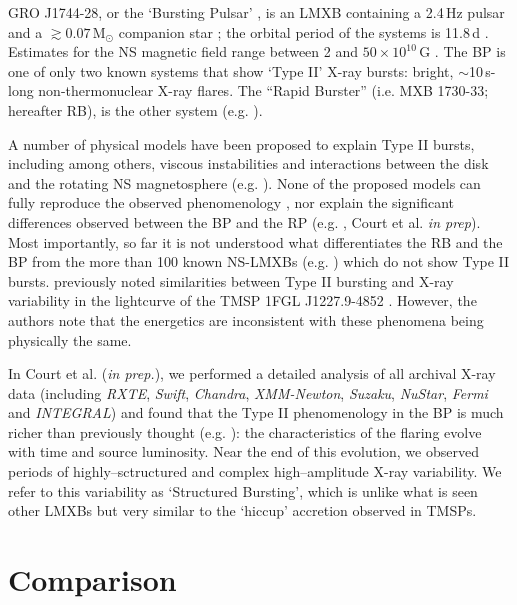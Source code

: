 \par GRO J1744-28, or the `Bursting Pulsar' \citep[hereafter BP,][]{Paciesas_BPDiscovery}, is an LMXB containing a 2.4\,Hz pulsar and a $\gtrsim0.07$\,M$_\odot$ companion star \citep[e.g.][]{Sturner_BPNature,Finger_BP,Degenaar_BPSpec}; the orbital period of the systems is 11.8\,d \citep{Finger_Pulse,Sanna_BP}. Estimates for the NS magnetic field range between  2 and $50\times10^{10}$\,G \citep{Finger_BP,Degenaar_BPSpec,Dai_OB3,Doroshenko_NBFlash}.  The BP is one of only two known systems that show `Type II' X-ray bursts: bright, $\sim$10\,s-long non-thermonuclear X-ray flares.  The ``Rapid Burster'' (i.e. MXB 1730-33; hereafter RB), is the other system (e.g. \citealp{Lewin_TypeII,Kouveliotou_BP}).
\par A number of physical models have been proposed to explain Type II bursts, including among others,  viscous instabilities and interactions between the disk and the rotating NS magnetosphere (e.g. \citealp{Taam_Evo,Spruit_Type2Mod}). None of the proposed models can fully reproduce the observed phenomenology \citep{Lewin_Bursts}, nor explain the significant differences observed between the BP and the RP  (e.g. \citealp{Lewin_BP}, Court et al. \textit{in prep}). Most importantly, so far it is not understood what differentiates the RB and the BP from the more than 100 known NS-LMXBs (e.g. \citealp{Liu_Catalog}) which do not show Type II bursts. \citealp{DeMartino_XSS} previously noted similarities between Type II bursting and X-ray variability in the lightcurve of the TMSP 1FGL J1227.9-4852 \citep{Hill_XSS}.  However, the authors note that the energetics are inconsistent with these phenomena being physically the same.
\par In Court et al. (\textit{in prep.}), we performed a detailed analysis of all archival X-ray data (including \textit{RXTE}, \textit{Swift}, \textit{Chandra}, \textit{XMM-Newton}, \textit{Suzaku}, \textit{NuStar}, \textit{Fermi} and \textit{INTEGRAL}) and found that the Type II phenomenology in the BP is much richer than previously thought (e.g. \citealp{Giles_BP}): the characteristics of the flaring evolve with time and source luminosity. Near the end of this evolution, we observed periods of highly--sctructured and complex high--amplitude X-ray variability. We refer to this variability as `Structured Bursting', which is unlike what is seen other LMXBs but very similar to the `hiccup' accretion observed in TMSPs.

\section{Comparison}

